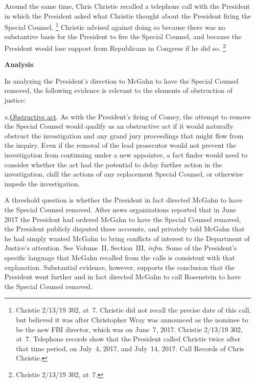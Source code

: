 Around the same time, Chris Christie recalled a telephone call with the President in which the President asked what Christie thought about the President firing the Special Counsel.%
\footnote{Christie 2/13/19 302, at~7.
Christie did not recall the precise date of this call, but believed it was after Christopher Wray was announced as the nominee to be the new FBI director, which was on June~7, 2017.
Christie 2/13/19 302, at~7.
Telephone records show that the President called Christie twice after that time period, on July~4, 2017, and July~14, 2017.
Call Records of Chris Christie.}
Christie advised against doing so because there was no substantive basis for the President to fire the Special Counsel, and because the President would lose support from Republicans in Congress if he did so.%
\footnote{Christie 2/13/19 302, at~7.}

\begin{center}
\textbf{Analysis}
\end{center}

In analyzing the President's direction to McGahn to have the Special Counsel removed, the following evidence is relevant to the elements of obstruction of justice:

a.\qquad\underline{Obstructive act}.
As with the President's firing of Comey, the attempt to remove the Special Counsel would qualify as an obstructive act if it would naturally obstruct the investigation and any grand jury proceedings that might flow from the inquiry.
Even if the removal of the lead prosecutor would not prevent the investigation from continuing under a new appointee, a fact finder would need to consider whether the act had the potential to delay further action in the investigation, chill the actions of any replacement Special Counsel, or otherwise impede the investigation.

A threshold question is whether the President in fact directed McGahn to have the Special Counsel removed.
After news organizations reported that in June 2017 the President had ordered McGahn to have the
Special Counsel removed, the President publicly disputed these accounts, and privately told McGahn that he had simply wanted McGahn to bring conflicts of interest to the Department of Justice's attention.
See Volume~II, Section~III, \textit{infra}.
Some of the President's specific language that McGahn recalled from the calls is consistent with that explanation.
Substantial evidence, however, supports the conclusion that the President went further and in fact directed McGahn to call Rosenstein to have the Special Counsel removed.


